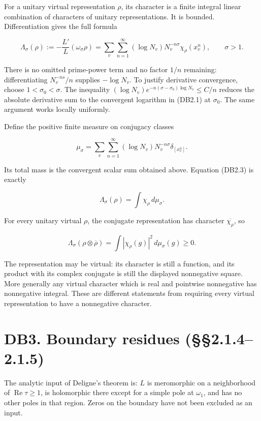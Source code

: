 \documentclass[
]{report}
\begin{document}
For a unitary virtual representation \(\rho\), its character is a finite
integral linear combination of characters of unitary representations. It
is bounded. Differentiation gives the full formula

\[
 \Lambda_\sigma(\rho):=-\frac{L'}{L}(\omega_\sigma\rho)
  =\sum_{v}\sum_{n=1}^{\infty}
       (\log N_v)N_v^{-n\sigma}\chi_\rho(x_v^n),\qquad\sigma>1.
 \tag{DB2.3}
\]

There is no omitted prime-power term and no factor \(1/n\) remaining:
differentiating \(N_v^{-ns}/n\) supplies \(-\log N_v\). To justify
derivative convergence, choose \(1<\sigma_0<\sigma\). The inequality
\((\log N_v)e^{-n(\sigma-\sigma_0)\log N_v}\leq C/n\) reduces the
absolute derivative sum to the convergent logarithm in (DB2.1) at
\(\sigma_0\). The same argument works locally uniformly.

Define the positive finite measure on conjugacy classes

\[
 \mu_\sigma=
 \sum_v\sum_{n=1}^{\infty}
      (\log N_v)N_v^{-n\sigma}\delta_{[x_v^n]}.
 \tag{DB2.4}
\]

Its total mass is the convergent scalar sum obtained above. Equation
(DB2.3) is exactly

\[
 \Lambda_\sigma(\rho)=\int\chi_\rho\,d\mu_\sigma.
 \tag{DB2.5}
\]

For every unitary virtual \(\rho\), the conjugate representation has
character \(\overline{\chi_\rho}\), so

\[
 \Lambda_\sigma(\rho\otimes\overline\rho)
       =\int|\chi_\rho(g)|^2\,d\mu_\sigma(g)\geq0.
 \tag{DB2.6}
\]

The representation may be virtual: its character is still a function,
and its product with its complex conjugate is still the displayed
nonnegative square. More generally any virtual character which is real
and pointwise nonnegative has nonnegative integral. These are different
statements from requiring every virtual representation to have a
nonnegative character.

\section{DB3. Boundary residues
(§§2.1.4--2.1.5)}\label{db3.-boundary-residues-2.1.42.1.5}

The analytic input of Deligne's theorem is: \(L\) is meromorphic on a
neighborhood of \(\operatorname{Re}\tau\geq1\), is holomorphic there
except for a simple pole at \(\omega_1\), and has no other poles in that
region. Zeros on the boundary have not been excluded as an input.
\end{document}
